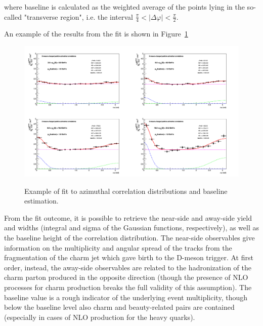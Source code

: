 where baseline is calculated as the weighted average of the points lying in the so-called "transverse region", i.e. the interval $\frac{\pi}{4}<|\Delta\varphi|<\frac{\pi}{2}$.

An example of the results from the fit is shown in Figure~\ref{fig:ExFit}

\begin{figure}[h]
\centering
{\includegraphics[width=0.99\linewidth, height=0.70\linewidth]{figures/FitOutput/cFitting_0_pthad1dotto99dot.png}}
\caption{Example of fit to azimuthal correlation distributions and baseline estimation.}
 \label{fig:ExFit}
 \end{figure}

From the fit outcome, it is possible to retrieve the near-side and away-side yield and widths (integral and sigma of the Gaussian functions, respectively), as well as the baseline height of the correlation distribution. The near-side observables give information on the multiplicity and angular spread of the tracks from the fragmentation of the charm jet which gave birth to the D-meson trigger. At first order, instead, the away-side observables are related to the hadronization of the charm parton produced in the opposite direction (though the presence of NLO processes for charm production breaks the full validity of this assumption). The baseline value is a rough indicator of the underlying event multiplicity, though below the baseline level also charm and beauty-related pairs are contained (especially in cases of NLO production for the heavy quarks).

